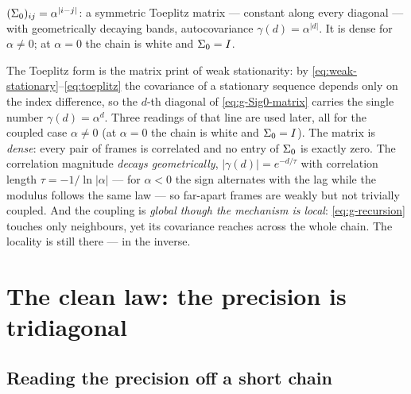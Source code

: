 \begin{proposition}\label{prop:g-Sigma0}
$(\Sigma_0)_{ij} = \alpha^{|i-j|}$: a symmetric Toeplitz matrix ---
constant along every diagonal --- with geometrically decaying bands,
autocovariance $\gamma(d) = \alpha^{|d|}$. It is dense for $\alpha \neq 0$;
at $\alpha = 0$ the chain is white and $\Sigma_0 = I$.
\end{proposition}

The Toeplitz form is the matrix print of weak stationarity: by
\eqref{eq:weak-stationary}--\eqref{eq:toeplitz} the covariance of a stationary
sequence depends only on the index difference, so the $d$-th diagonal of
\eqref{eq:g-Sig0-matrix} carries the single number $\gamma(d) = \alpha^d$.
Three readings of that line are used later, all for the coupled case
$\alpha \neq 0$ (at $\alpha = 0$ the chain is white and $\Sigma_0 = I$). The
matrix is \emph{dense}: every pair of frames is correlated and no entry of
$\Sigma_0$ is exactly zero. The correlation magnitude \emph{decays
geometrically}, $|\gamma(d)| = e^{-d/\tau}$ with correlation length
$\tau = -1/\ln|\alpha|$ --- for $\alpha < 0$ the sign alternates with the
lag while the modulus follows the same law --- so far-apart frames are weakly
but not trivially coupled. And the coupling is \emph{global though the
mechanism is local}: \eqref{eq:g-recursion} touches only neighbours, yet its
covariance reaches across the whole chain. The locality is still there --- in
the inverse.

\section{The clean law: the precision is tridiagonal}
\label{sec:g-precision}

\subsection{Reading the precision off a short chain}


